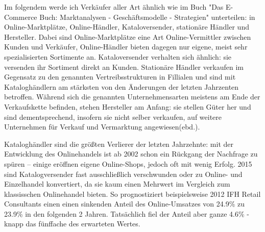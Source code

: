 \begin{folding} %

Im folgendem werde ich Verkäufer aller Art ähnlich wie im Buch "Das E-Commerce Buch: Marktanalysen - Geschäftsmodelle - Strategien" unterteilen: in Online-Marktplätze, Online-Händler, Kataloversender, stationäre Händler und Hersteller\cite[S. 15ff]{Graf}. Dabei sind Online-Marktplätze eine Art Online-Vermittler zwischen Kunden und Verkäufer, Online-Händler bieten dagegen nur eigene, meist sehr spezialisierten Sortimente an. Kataloversender verhalten sich ähnlich: sie versenden ihr Sortiment direkt an Kunden. Stationäre Händler verkaufen im Gegensatz zu den genannten Vertreibsstrukturen in Fillialen und sind mit Kataloghändlern am stärksten von den Änderungen der letzten Jahrzenten betroffen. Während sich die genannten Unternehmensarten meistens am Ende der Verkaufskette befinden, stehen Hersteller am Anfang: sie stellen Güter her und sind dementsprechend, insofern sie nicht selber verkaufen, auf weitere Unternehmen für Verkauf und Vermarktung angewiesen(ebd.). %

\end{folding}

\begin{folding} %

Kataloghändler sind die größten Verlierer der letzten Jahrzehnte: mit der Entwicklung des Onlinehandels ist ab 2002 schon ein Rückgang der Nachfrage zu spüren – einige eröffnen eigene Online-Shops\cite[S. 24f]{Graf}, jedoch oft mit wenig Erfolg\cite[S. 38]{Graf}. 2015 sind Katalogversender fast ausschließlich verschwunden oder zu Online- und Einzelhandel konvertiert, da sie kaum einen Mehrwert im Vergleich zum klassisschen Onlinehandel bieten\cite[S. 47]{Graf}. So prognostiziert beispielsweise 2012 IFH Retail Consultants einen einen sinkenden Anteil des Online-Umsatzes von 24.9\% zu 23.9\% in den folgenden 2 Jahren\cite[S. 20]{evilcom}. Tatsächlich fiel der Anteil aber ganze 4.6\% - knapp das fünffache des erwarteten Wertes\cite{statista-vertriebsformen}. %

\end{folding}

